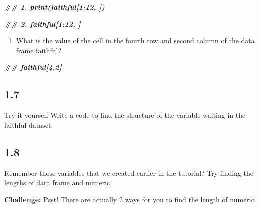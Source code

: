 \documentclass[
]{book}
\newenvironment{Shaded}{\begin{snugshade}}{\end{snugshade}}
\newcommand{\DocumentationTok}[1]{\textcolor[rgb]{0.56,0.35,0.01}{\textbf{\textit{#1}}}}
\providecommand{\tightlist}{%
  \setlength{\itemsep}{0pt}\setlength{\parskip}{0pt}}
\begin{document}
\begin{Shaded}
\begin{Highlighting}[]
\DocumentationTok{\#\# 1. print(faithful[1:12, ])}

\DocumentationTok{\#\# 2. faithful[1:12, ]}
\end{Highlighting}
\end{Shaded}

\begin{enumerate}
\def\labelenumi{\arabic{enumi}.}
\setcounter{enumi}{1}
\tightlist
\item
  What is the value of the cell in the fourth row and second column of the data frame faithful?
\end{enumerate}

\begin{Shaded}
\begin{Highlighting}[]
\DocumentationTok{\#\# faithful[4,2]}
\end{Highlighting}
\end{Shaded}

\hypertarget{section-6}{%
\subsection{1.7}\label{section-6}}

Try it yourself
Write a code to find the structure of the variable waiting in the faithful dataset.

\begin{Shaded}
\end{Shaded}

\hypertarget{section-7}{%
\subsection{1.8}\label{section-7}}

Remember those variables that we created earlier in the tutorial? Try finding the lengths of data frame and numeric.

\textbf{Challenge:} Psst! There are actually 2 ways for you to find the length of numeric.

\begin{Shaded}
\end{Shaded}
\end{document}
